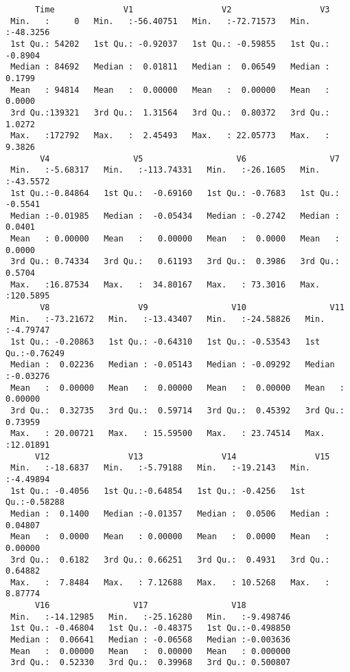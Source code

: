 \documentclass[
  11pt,
  letterpaper,
  DIV=11,
  numbers=noendperiod]{scrartcl}
\begin{document}
\begin{verbatim}
      Time              V1                  V2                  V3          
 Min.   :     0   Min.   :-56.40751   Min.   :-72.71573   Min.   :-48.3256  
 1st Qu.: 54202   1st Qu.: -0.92037   1st Qu.: -0.59855   1st Qu.: -0.8904  
 Median : 84692   Median :  0.01811   Median :  0.06549   Median :  0.1799  
 Mean   : 94814   Mean   :  0.00000   Mean   :  0.00000   Mean   :  0.0000  
 3rd Qu.:139321   3rd Qu.:  1.31564   3rd Qu.:  0.80372   3rd Qu.:  1.0272  
 Max.   :172792   Max.   :  2.45493   Max.   : 22.05773   Max.   :  9.3826  
       V4                 V5                   V6                 V7          
 Min.   :-5.68317   Min.   :-113.74331   Min.   :-26.1605   Min.   :-43.5572  
 1st Qu.:-0.84864   1st Qu.:  -0.69160   1st Qu.: -0.7683   1st Qu.: -0.5541  
 Median :-0.01985   Median :  -0.05434   Median : -0.2742   Median :  0.0401  
 Mean   : 0.00000   Mean   :   0.00000   Mean   :  0.0000   Mean   :  0.0000  
 3rd Qu.: 0.74334   3rd Qu.:   0.61193   3rd Qu.:  0.3986   3rd Qu.:  0.5704  
 Max.   :16.87534   Max.   :  34.80167   Max.   : 73.3016   Max.   :120.5895  
       V8                  V9                 V10                 V11          
 Min.   :-73.21672   Min.   :-13.43407   Min.   :-24.58826   Min.   :-4.79747  
 1st Qu.: -0.20863   1st Qu.: -0.64310   1st Qu.: -0.53543   1st Qu.:-0.76249  
 Median :  0.02236   Median : -0.05143   Median : -0.09292   Median :-0.03276  
 Mean   :  0.00000   Mean   :  0.00000   Mean   :  0.00000   Mean   : 0.00000  
 3rd Qu.:  0.32735   3rd Qu.:  0.59714   3rd Qu.:  0.45392   3rd Qu.: 0.73959  
 Max.   : 20.00721   Max.   : 15.59500   Max.   : 23.74514   Max.   :12.01891  
      V12                V13                V14                V15          
 Min.   :-18.6837   Min.   :-5.79188   Min.   :-19.2143   Min.   :-4.49894  
 1st Qu.: -0.4056   1st Qu.:-0.64854   1st Qu.: -0.4256   1st Qu.:-0.58288  
 Median :  0.1400   Median :-0.01357   Median :  0.0506   Median : 0.04807  
 Mean   :  0.0000   Mean   : 0.00000   Mean   :  0.0000   Mean   : 0.00000  
 3rd Qu.:  0.6182   3rd Qu.: 0.66251   3rd Qu.:  0.4931   3rd Qu.: 0.64882  
 Max.   :  7.8484   Max.   : 7.12688   Max.   : 10.5268   Max.   : 8.87774  
      V16                 V17                 V18           
 Min.   :-14.12985   Min.   :-25.16280   Min.   :-9.498746  
 1st Qu.: -0.46804   1st Qu.: -0.48375   1st Qu.:-0.498850  
 Median :  0.06641   Median : -0.06568   Median :-0.003636  
 Mean   :  0.00000   Mean   :  0.00000   Mean   : 0.000000  
 3rd Qu.:  0.52330   3rd Qu.:  0.39968   3rd Qu.: 0.500807  

\end{verbatim}
\end{document}

